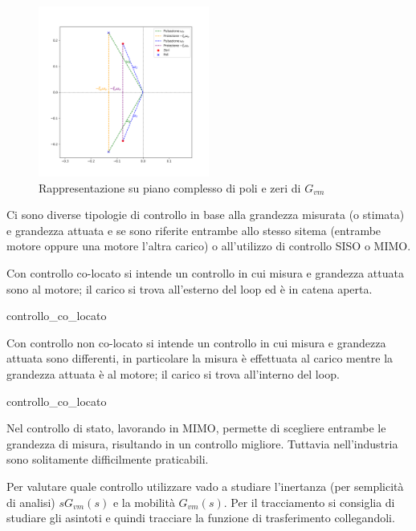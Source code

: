 \begin{figure}[h]
    \centering
    \includegraphics[width=0.5\textwidth]{Immagini/poli_zeri_Gvm.png}
    \caption{Rappresentazione su piano complesso di poli e zeri di \(G_{vm}\)}
\end{figure}

Ci sono diverse tipologie di controllo in base alla grandezza misurata (o stimata) e grandezza attuata e se sono riferite entrambe allo stesso sitema (entrambe motore oppure una motore l'altra carico) o all'utilizzo di controllo SISO o MIMO.

Con controllo co-locato si intende un controllo in cui misura e grandezza attuata sono al motore; il carico si trova all'esterno del loop ed è in catena aperta.

{controllo_co_locato}

Con controllo non co-locato si intende un controllo in cui misura e grandezza attuata sono differenti, in particolare la misura è effettuata al carico mentre la grandezza attuata è al motore; il carico si trova all'interno del loop.

{controllo_co_locato}

Nel controllo di stato, lavorando in MIMO, permette di scegliere entrambe le grandezza di misura, risultando in un controllo migliore. Tuttavia nell'industria sono solitamente difficilmente praticabili. 

Per valutare quale controllo utilizzare vado a studiare l'inertanza (per semplicità di analisi) \(sG_{vm}(s)\) e la mobilità \(G_{vm}(s)\). Per il tracciamento si consiglia di studiare gli asintoti e quindi tracciare la funzione di trasferimento collegandoli.

